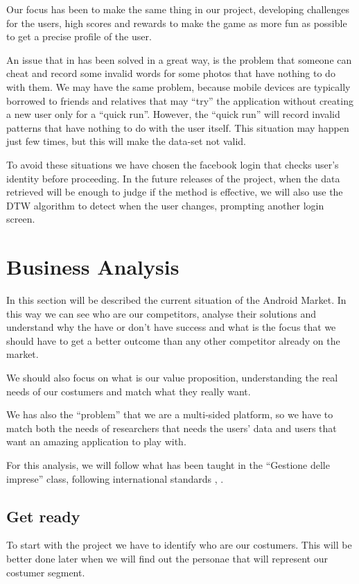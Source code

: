 Our focus has been to make the same thing in our project, developing challenges for the users, high scores and rewards to make the game as more fun as possible to get a precise profile of the user.

An issue that in \cite{vonAhn:2004:LIC:985692.985733} has been solved in a great way, is the problem that someone can cheat and record some invalid words for some photos that have nothing to do with them. We may have the same problem, because mobile devices are typically borrowed to friends and relatives that may ``try'' the application without creating a new user only for a ``quick run''. However, the ``quick run'' will record invalid patterns that have nothing to do with the user itself. This situation may happen just few times, but this will make the data-set not valid. 

To avoid these situations we have chosen the facebook login that checks user's identity before proceeding. In the future releases of the project, when the data retrieved will be enough to judge if the method is effective, we will also use the DTW algorithm to detect when the user changes, prompting another login screen.

\newpage

\section{Business Analysis}
\label{sec:businessAnalysis}

In this section will be described the current situation of the Android Market. In this way we can see who are our competitors, analyse their solutions and understand why the have or don't have success and what is the focus that we should have to get a better outcome than any other competitor already on the market.

We should also focus on what is our value proposition, understanding the real needs of our costumers and match what they really want. 

We has also the ``problem'' that we are a multi-sided platform, so we have to match both the needs of researchers that needs the users' data and users that want an amazing application to play with. 

For this analysis, we will follow what has been taught in the ``Gestione delle imprese'' class, following international standards \cite{article:ElementsOfUserExperience}, \cite{market-driven-management}.

\subsection{Get ready}
To start with the project we have to identify who are our costumers. This will be better done later when we will find out the personae that will represent our costumer segment.

